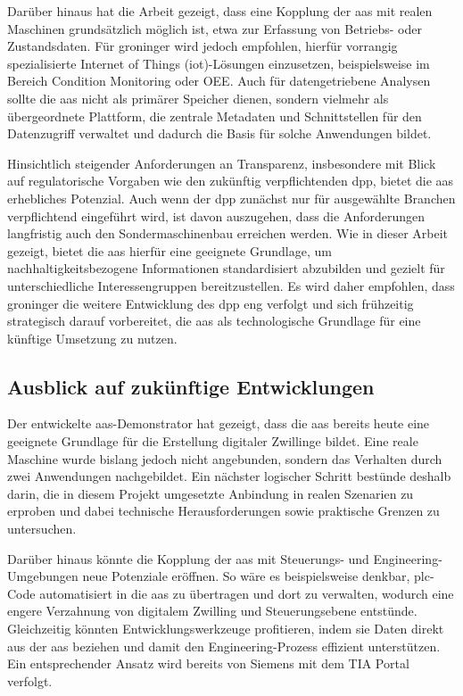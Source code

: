 Darüber hinaus hat die Arbeit gezeigt, dass eine Kopplung der \acs{aas} mit realen Maschinen grundsätzlich möglich ist, etwa zur Erfassung von Betriebs- oder Zustandsdaten. 
Für groninger wird jedoch empfohlen, hierfür vorrangig spezialisierte Internet of Things (\acs{iot})-Lösungen einzusetzen, beispielsweise im Bereich Condition Monitoring oder OEE.
Auch für datengetriebene Analysen sollte die \acs{aas} nicht als primärer Speicher dienen, sondern vielmehr als übergeordnete Plattform, die zentrale Metadaten und Schnittstellen für den Datenzugriff verwaltet und dadurch die Basis für solche Anwendungen bildet.

Hinsichtlich steigender Anforderungen an Transparenz, insbesondere mit Blick auf regulatorische Vorgaben wie den zukünftig verpflichtenden \acs{dpp}, bietet die \acs{aas} erhebliches Potenzial. 
Auch wenn der \acs{dpp} zunächst nur für ausgewählte Branchen verpflichtend eingeführt wird, ist davon auszugehen, dass die Anforderungen langfristig auch den Sondermaschinenbau erreichen werden. 
Wie in dieser Arbeit gezeigt, bietet die \acs{aas} hierfür eine geeignete Grundlage, um nachhaltigkeitsbezogene Informationen standardisiert abzubilden und gezielt für unterschiedliche Interessengruppen bereitzustellen. 
Es wird daher empfohlen, dass groninger die weitere Entwicklung des \acs{dpp} eng verfolgt und sich frühzeitig strategisch darauf vorbereitet, die \acs{aas} als technologische Grundlage für eine künftige Umsetzung zu nutzen.

\subsection{Ausblick auf zukünftige Entwicklungen}
Der entwickelte \acs{aas}-Demonstrator hat gezeigt, dass die \acs{aas} bereits heute eine geeignete Grundlage für die Erstellung digitaler Zwillinge bildet. 
Eine reale Maschine wurde bislang jedoch nicht angebunden, sondern das Verhalten durch zwei Anwendungen nachgebildet. 
Ein nächster logischer Schritt bestünde deshalb darin, die in diesem Projekt umgesetzte Anbindung in realen Szenarien zu erproben und dabei technische Herausforderungen sowie praktische Grenzen zu untersuchen. 

Darüber hinaus könnte die Kopplung der \acs{aas} mit Steuerungs- und Engineering-Umge\-bungen neue Potenziale eröffnen. 
So wäre es beispielsweise denkbar, \acs{plc}-Code automatisiert in die \acs{aas} zu übertragen und dort zu verwalten, wodurch eine engere Verzahnung von digitalem Zwilling und Steuerungsebene entstünde. 
Gleichzeitig könnten Entwicklungswerkzeuge profitieren, indem sie Daten direkt aus der \acs{aas} beziehen und damit den Engineering-Prozess effizient unterstützen. 
Ein entsprechender Ansatz wird bereits von Siemens mit dem TIA Portal verfolgt.

